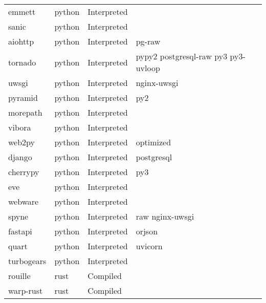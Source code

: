 \begin{longtable}{llll}
    emmett           & python & Interpreted     &                                                    \\
    sanic            & python & Interpreted     &                                                    \\
    aiohttp          & python & Interpreted     & pg-raw                                             \\
    tornado          & python & Interpreted     & pypy2 postgresql-raw py3 py3-uvloop                \\
    uwsgi            & python & Interpreted     & nginx-uwsgi                                        \\
    pyramid          & python & Interpreted     & py2                                                \\
    morepath         & python & Interpreted     &                                                    \\
    vibora           & python & Interpreted     &                                                    \\
    web2py           & python & Interpreted     & optimized                                          \\
    django           & python & Interpreted     & postgresql                                         \\
    cherrypy         & python & Interpreted     & py3                                                \\
    eve              & python & Interpreted     &                                                    \\
    webware          & python & Interpreted     &                                                    \\
    spyne            & python & Interpreted     & raw nginx-uwsgi                                    \\
    fastapi          & python & Interpreted     & orjson                                             \\
    quart            & python & Interpreted     & uvicorn                                            \\
    turbogears       & python & Interpreted     &                                                    \\
    rouille          & rust & Compiled        &                                                    \\
    warp-rust        & rust & Compiled        &                                                    \\

\end{longtable}
